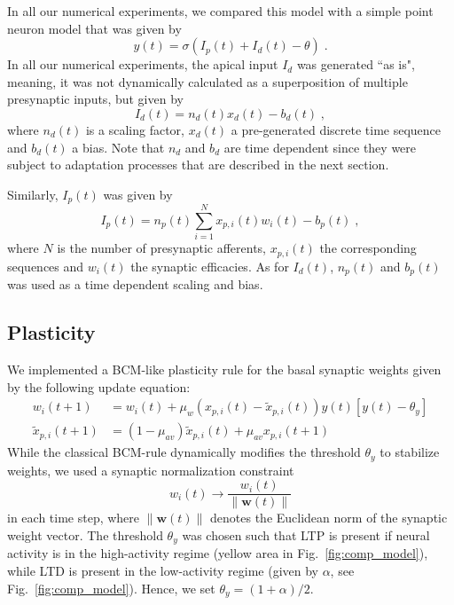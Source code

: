 \documentclass[10pt,a4paper,twocolumn]{article}
\begin{document}
		In all our numerical experiments, we compared this model with a 
		simple point neuron model that was given by
		\begin{equation}
			y(t) = \sigma\left(I_p(t) + I_d(t) - \theta \right) \; .
		\end{equation}
		In all our numerical experiments, the apical input $I_d$ was generated
		``as is", meaning, it was not dynamically calculated as a superposition
		of multiple presynaptic inputs, but given by
		\begin{equation}
			I_d(t) = n_d(t) x_d(t) - b_d(t) \; ,
			\label{eq:I_d}
		\end{equation}
		where $n_d(t)$ is a scaling factor, $x_d(t)$ a pre-generated
		discrete time sequence and $b_d(t)$ a bias. Note that $n_d$ and $b_d$ 
		are time dependent since they were subject to adaptation processes 
		that are described in the next section.
		
		Similarly, $I_p(t)$ was given by
		\begin{equation}
			I_p(t) = n_p(t) \sum_{i=1}^{N} x_{p,i}(t) w_i(t) - b_p(t) \; ,
		\end{equation}
		where $N$ is the number of presynaptic afferents, $x_{p,i}(t)$ the
		corresponding sequences and $w_i(t)$ the synaptic efficacies.
		As for $I_d(t)$, $n_p(t)$ and $b_p(t)$ was used as a time dependent
		scaling and bias.
		
		\subsection{Plasticity}
		
		We implemented a BCM-like plasticity rule for the basal 
		synaptic weights given by the following update equation:
		\begin{align}
			w_i(t+1) &= w_i(t) + \mu_w \left(x_{p,i}(t) - \tilde{x}_{p,i}(t)\right)
			y(t)\left[y(t) - \theta_y \right]
			\label{eq:bcm_plast} \\
			\tilde{x}_{p,i}(t+1) &= (1-\mu_{av})\tilde{x}_{p,i}(t) + \mu_{av}x_{p,i}(t+1)
		\end{align}
		While the classical BCM-rule dynamically modifies the 
		threshold $\theta_y$ to stabilize weights, we used a
		synaptic normalization constraint
		\begin{equation}
			w_i(t) \rightarrow \frac{w_i(t)}{\lVert \mathbf{w}(t)\rVert}
		\end{equation}
		in each time step, where $\lVert \mathbf{w}(t)\rVert$ denotes the Euclidean
		norm of the synaptic weight vector. The threshold $\theta_y$ was
		chosen such that LTP is present if neural activity is in the
		high-activity regime (yellow area in Fig.~\ref{fig:comp_model}), while
		LTD is present in the low-activity regime 
		(given by $\alpha$, see Fig.~\ref{fig:comp_model}). Hence, we set
		$\theta_y = (1+\alpha)/2$.
		
\end{document}
